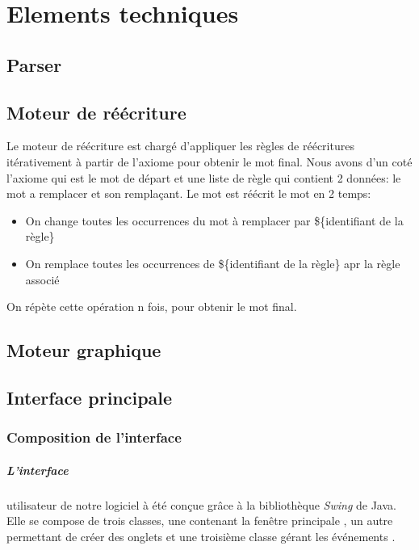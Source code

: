 \chapter{Elements techniques}

\section{Parser}\label{sec:parser}

\section{Moteur de réécriture}

Le moteur de réécriture est chargé d'appliquer les règles de réécritures itérativement à partir de l'axiome pour obtenir le mot final.
Nous avons d'un coté l'axiome qui est le mot de départ et une liste de règle qui contient 2 données: le mot a remplacer et son remplaçant.
Le mot est réécrit le mot en 2 temps:\\
\begin{itemize}
    \item On change toutes les occurrences du mot à remplacer par \$\{identifiant de la règle\}
    \item On remplace toutes les occurrences de \$\{identifiant de la règle\} apr la règle associé
\end{itemize}
On répète cette opération n fois, pour obtenir le mot final.

\section{Moteur graphique}\label{src:interface3d}

\section{Interface principale}\label{sec:menu}

\subsection{Composition de l'interface}

\paragraph{L'interface}
 utilisateur de notre logiciel à été conçue grâce à la bibliothèque \textit{Swing} de Java. Elle se compose de trois classes, une contenant la fenêtre principale , un autre permettant de créer des onglets  et une troisième classe gérant les événements .
 
